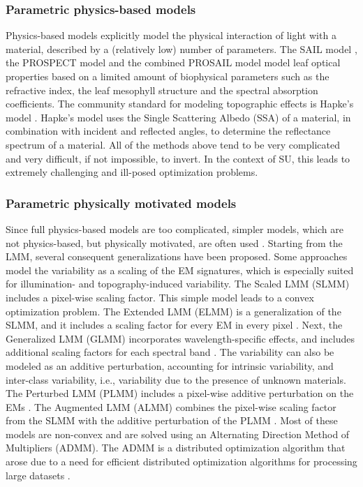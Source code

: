 \subsubsection{Parametric physics-based models}
Physics-based models explicitly model the physical interaction of light with a material, described by a (relatively low) number of parameters. The SAIL model \cite{verhoef_light_1984}, the PROSPECT model \cite{jacquemoud_prospect_1990} and the combined PROSAIL model \cite{jacquemoud_prospect_2009}  model leaf optical properties based on a limited amount of biophysical parameters such as the refractive index, the leaf mesophyll structure and the spectral absorption coefficients. The community standard for modeling topographic effects is Hapke's model \cite{hapke_theory_2012, heylen_review_2014}. Hapke's model uses the Single Scattering Albedo (SSA) of a material, in combination with incident and reflected angles, to determine the reflectance spectrum of a material. All of the methods above tend to be very complicated and very difficult, if not impossible, to invert. In the context of SU, this leads to extremely challenging and ill-posed optimization problems. 

\subsubsection{Parametric physically motivated models}
Since full physics-based models are too complicated, simpler models, which are not physics-based, but physically motivated, are often used \cite{borsoi_spectral_2021}. Starting from the LMM, several consequent generalizations have been proposed. 
Some approaches model the variability as a scaling of the EM signatures, which is especially suited for illumination- and topography-induced variability. The Scaled LMM (SLMM) includes a pixel-wise scaling factor. This simple model leads to a convex optimization problem. The Extended LMM (ELMM) is a generalization of the SLMM, and it includes a scaling factor for every EM in every pixel \cite{drumetz_blind_2016}. Next, the Generalized LMM (GLMM) incorporates wavelength-specific effects, and includes additional scaling factors for each spectral band \cite{imbiriba_generalized_2018}. 
The variability can also be modeled as an additive perturbation, accounting for intrinsic variability, and inter-class variability, i.e., variability due to the presence of unknown materials. The Perturbed LMM (PLMM) includes a pixel-wise additive perturbation on the EMs \cite{thouvenin_hyperspectral_2016}. The Augmented LMM (ALMM) combines the pixel-wise scaling factor from the SLMM with the additive perturbation of the PLMM \cite{hong_augmented_2019}.
Most of these models are non-convex and are solved using an Alternating Direction Method of Multipliers (ADMM). The ADMM is a distributed optimization algorithm that arose due to a need for efficient distributed optimization algorithms for processing large datasets \cite{boyd_distributed_2011}.

